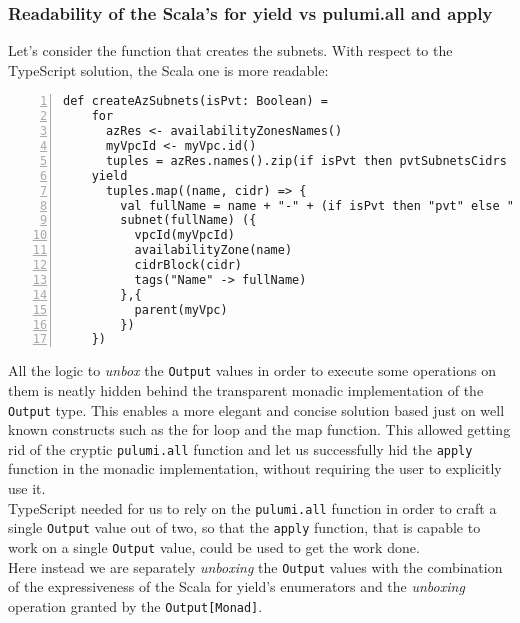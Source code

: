 \subsubsection{Readability of the Scala's for yield vs pulumi.all and apply}
\label{sssec:readability-for-yield}
Let's consider the function that creates the subnets.
With respect to the TypeScript solution, the Scala one is more readable:\\
\begin{minipage}{\linewidth}
  \begin{lstlisting}[numbers=left, numberstyle=\tiny, numbersep=-5pt, stepnumber=1]
  def createAzSubnets(isPvt: Boolean) =
    for
      azRes <- availabilityZonesNames()
      myVpcId <- myVpc.id()
      tuples = azRes.names().zip(if isPvt then pvtSubnetsCidrs else pubSubnetsCidrs)
    yield
      tuples.map((name, cidr) => {
        val fullName = name + "-" + (if isPvt then "pvt" else "pub") + "-subnet-scala"
        subnet(fullName) ({
          vpcId(myVpcId)
          availabilityZone(name)
          cidrBlock(cidr)
          tags("Name" -> fullName)
        },{
          parent(myVpc)
        })
    })
  \end{lstlisting}
\end{minipage}
All the logic to \textit{unbox} the \texttt{Output} values in order to execute some operations on them is neatly hidden behind the transparent monadic implementation of the \texttt{Output} type.
This enables a more elegant and concise solution based just on well known constructs such as the for loop and the map function.
This allowed getting rid of the cryptic \texttt{pulumi.all} function and let us successfully hid the \texttt{apply} function in the monadic implementation, without requiring the user to explicitly use it.\\
TypeScript needed for us to rely on the \texttt{pulumi.all} function in order to craft a single \texttt{Output} value out of two, so that the \texttt{apply} function, that is capable to work on a single \texttt{Output} value, could be used to get the work done.\\
Here instead we are separately \textit{unboxing} the \texttt{Output} values with the combination of the expressiveness of the Scala for yield's enumerators and the \textit{unboxing} operation granted by the \texttt{Output[Monad]}.\\
